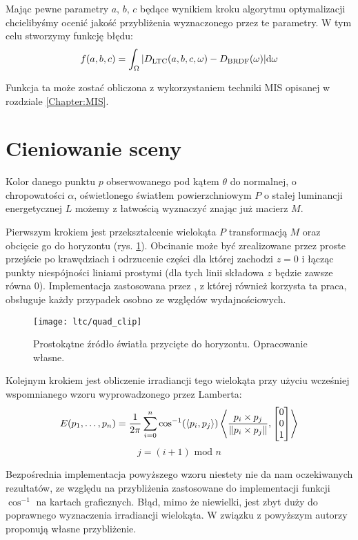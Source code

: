 \documentclass[../main.tex]{subfiles}
\begin{document}
Mając pewne parametry $a$, $b$, $c$ będące wynikiem kroku algorytmu optymalizacji chcielibyśmy ocenić jakość przybliżenia wyznaczonego przez te parametry. W tym celu stworzymy funkcję błędu:
\[
  f(a,b,c) =
    \int_{\Omega} {
      \abs{
        {D_{\text{LTC}}(a, b, c, \omega) - D_{\text{BRDF}}(\omega)}
      }
    } \dd \omega
\]

Funkcja ta może zostać obliczona z wykorzystaniem techniki MIS opisanej w rozdziale \ref{Chapter:MIS}.

\section{Cieniowanie sceny}

Kolor danego punktu $p$ obserwowanego pod kątem $\theta$ do normalnej, o chropowatości $\alpha$, oświetlonego światłem powierzchniowym $P$ o stałej luminancji energetycznej $L$ możemy z łatwością wyznaczyć znając już macierz $M$.

Pierwszym krokiem jest przekształcenie wielokąta $P$ transformacją $M$ oraz obcięcie go do horyzontu (rys. \ref{fig:QuadClip}). Obcinanie może być zrealizowane przez proste przejście po krawędziach i odrzucenie części dla której zachodzi $z=0$ i łącząc punkty niespójności liniami prostymi (dla tych linii składowa $z$ będzie zawsze równa $0$). Implementacja zastosowana przez \cite{ltc_heitz}, z której również korzysta ta praca, obsługuje każdy przypadek osobno ze względów wydajnościowych.

\begin{figure}[h]
    \centering
    \texttt{[image: ltc/quad\_clip]}
    \caption{Prostokątne źródło światła przycięte do horyzontu. Opracowanie własne.}
    \label{fig:QuadClip}
\end{figure}

Kolejnym krokiem jest obliczenie irradiancji tego wielokąta przy użyciu wcześniej wspomnianego wzoru wyprowadzonego przez Lamberta:
\[
E(p_1, \ldots, p_n) =
\frac{1}{2\pi}
\sum_{i=0}^{n} {
    \cos^{-1}(\langle p_i, p_j \rangle)
    \left\langle {
        \frac{p_i \times p_j}{\norm{p_i \times p_j}},
        \left[ \begin{matrix} 0 \\ 0 \\ 1 \end{matrix} \right]
    } \right\rangle
}
\]
\[
j = (i+1) \text{ mod } n
\]

Bezpośrednia implementacja powyższego wzoru niestety nie da nam oczekiwanych rezultatów, ze względu na przybliżenia zastosowane do implementacji funkcji $\cos^{-1}$ na kartach graficznych. Błąd, mimo że niewielki, jest zbyt duży do poprawnego wyznaczenia irradiancji wielokąta. W związku z powyższym autorzy \cite{LTCJourneyPresentation} proponują własne przybliżenie.
\end{document}
